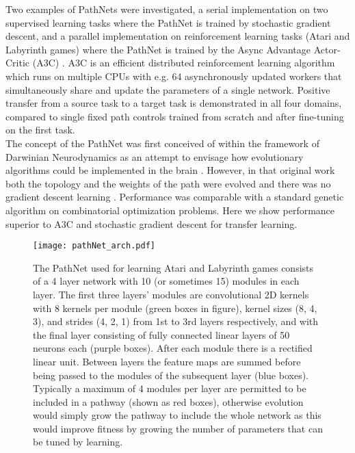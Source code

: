 \documentclass{sig-alternate-05-2015}
\begin{document}
Two examples of PathNets were investigated, a serial implementation on two supervised learning tasks where the PathNet is trained by stochastic gradient descent, and a parallel implementation on reinforcement learning tasks (Atari and Labyrinth games) where the PathNet is trained by the Async Advantage Actor-Critic (A3C) . A3C is an efficient distributed reinforcement learning algorithm which runs on multiple CPUs with e.g. 64 asynchronously updated workers that simultaneously share and update the parameters of a single network\cite{mnih2016asynchronous}. Positive transfer from a source task to a target task is demonstrated in all four domains, compared to single fixed path controls trained from scratch and after fine-tuning on the first task.\\ 

The concept of the PathNet was first conceived of within the framework of Darwinian Neurodynamics as an attempt to envisage how evolutionary algorithms could be implemented in the brain \cite{fernando2012selectionist}. However, in that original work both the topology and the weights of the path were evolved and there was no gradient descent learning \cite{fernando2011evolvable}. Performance was comparable with a standard genetic algorithm on combinatorial optimization problems. Here we show performance superior to A3C and stochastic gradient descent for transfer learning. \\

\begin{figure*}[h]
\centering
\texttt{[image: pathNet\_arch.pdf]}
\caption{The PathNet used for learning Atari and Labyrinth games consists of a 4 layer network with 10 (or sometimes 15) modules in each layer. The first three layers' modules are convolutional 2D kernels with 8 kernels per module (\textcolor{fig2_green}{green boxes} in figure), kernel sizes (8, 4, 3), and strides (4, 2, 1) from 1st to 3rd layers respectively, and with the final layer consisting of fully connected linear layers of 50 neurons each (\textcolor{fig2_purple}{purple boxes}). After each module there is a rectified linear unit. Between layers the feature maps are summed before being passed to the modules of the subsequent layer (\textcolor{fig2_blue}{blue boxes}). Typically a maximum of 4 modules per layer are permitted to be included in a pathway (shown as \textcolor{fig2_red}{red boxes}), otherwise evolution would simply grow the pathway to include the whole network as this would improve fitness by growing the number of parameters that can be tuned by learning.}
\label{fig:1}
\end{figure*}
\end{document}

